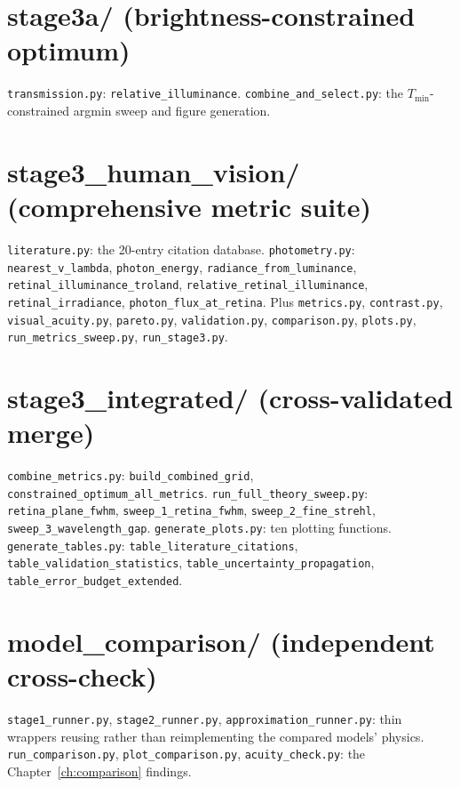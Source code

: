 \documentclass[11pt]{report}
\newcommand{\Tmin}{T_{\min}}
\begin{document}
\section*{stage3a/ (brightness-constrained optimum)}
\texttt{transmission.py}: \texttt{relative\_illuminance}. \texttt{combine\_and\_select.py}: the $\Tmin$-constrained argmin sweep and figure generation.

\section*{stage3\_human\_vision/ (comprehensive metric suite)}
\texttt{literature.py}: the 20-entry citation database. \texttt{photometry.py}: \texttt{nearest\_v\_lambda}, \texttt{photon\_energy}, \texttt{radiance\_from\_luminance}, \texttt{retinal\_illuminance\_troland}, \texttt{relative\_retinal\_illuminance}, \texttt{retinal\_irradiance}, \texttt{photon\_flux\_at\_retina}. Plus \texttt{metrics.py}, \texttt{contrast.py}, \texttt{visual\_acuity.py}, \texttt{pareto.py}, \texttt{validation.py}, \texttt{comparison.py}, \texttt{plots.py}, \texttt{run\_metrics\_sweep.py}, \texttt{run\_stage3.py}.

\section*{stage3\_integrated/ (cross-validated merge)}
\texttt{combine\_metrics.py}: \texttt{build\_combined\_grid}, \texttt{constrained\_optimum\_all\_metrics}. \texttt{run\_full\_theory\_sweep.py}: \texttt{retina\_plane\_fwhm}, \texttt{sweep\_1\_retina\_fwhm}, \texttt{sweep\_2\_fine\_strehl}, \texttt{sweep\_3\_wavelength\_gap}. \texttt{generate\_plots.py}: ten plotting functions. \texttt{generate\_tables.py}: \texttt{table\_literature\_citations}, \texttt{table\_validation\_statistics}, \texttt{table\_uncertainty\_propagation}, \texttt{table\_error\_budget\_extended}.

\section*{model\_comparison/ (independent cross-check)}
\texttt{stage1\_runner.py}, \texttt{stage2\_runner.py}, \texttt{approximation\_runner.py}: thin wrappers reusing rather than reimplementing the compared models' physics. \texttt{run\_comparison.py}, \texttt{plot\_comparison.py}, \texttt{acuity\_check.py}: the Chapter~\ref{ch:comparison} findings.
\end{document}
